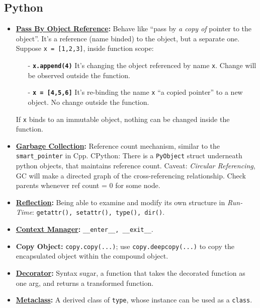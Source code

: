 \documentclass[9pt, landscape]{article}
\begin{document}
\begin{multicols*}{3}
\section{Python}
\begin{itemize}
	\item \textbf{\href{https://www.zhihu.com/question/20591688}{Pass By Object Reference}:} Behave like ``pass by \textit{a copy of} pointer to the object''. It's a reference (name binded) to the object, but a separate one. Suppose \texttt{x = [1,2,3]}, inside function scope:
	\begin{itemize}[leftmargin=10pt,noitemsep,topsep=0pt,partopsep=0pt]
		\item[-] \textbf{\texttt{x.append(4)}} It's changing the object referenced by name \texttt{x}. Change will be observed outside the function.
		\item[-] \textbf{\texttt{x = [4,5,6]}} It's re-binding the name \texttt{x} ``a copied pointer'' to a new object. No change outside the function.
	\end{itemize}
	If \texttt{x} binds to an immutable object, nothing can be changed inside the function.
	\item \textbf{\href{https://www.jianshu.com/p/1e375fb40506}{Garbage Collection}:} Reference count mechanism, similar to the \texttt{smart\_pointer} in Cpp. CPython: There is a \texttt{PyObject} struct underneath python objects, that maintains reference count. Caveat: \textit{Circular Referencing}, GC will make a directed graph of the cross-referencing relationship. Check parents whenever ref count = 0 for some node.
	\item \textbf{\href{https://en.wikibooks.org/wiki/Python_Programming/Reflection}{Reflection}:} Being able to examine and modify its own structure in \textit{Run-Time}: \texttt{getattr(), setattr(), type(), dir()}.
	\item \textbf{\href{https://docs.python.org/3/reference/compound_stmts.html\#the-with-statement}{Context Manager}:} \texttt{\_\_enter\_\_, \_\_exit\_\_}.
	\item \textbf{Copy Object:} \texttt{copy.copy(...)}; use \texttt{copy.deepcopy(...)} to copy the encapsulated object within the compound object.
	\item \textbf{\href{https://www.python.org/dev/peps/pep-0318/}{Decorator}:} Syntax sugar, a function that takes the decorated function as one arg, and returns a transformed function.
	\item \textbf{\href{https://zhuanlan.zhihu.com/p/23887627}{Metaclass}:} A derived class of \texttt{type}, whose instance can be used as a \texttt{class}.
\end{itemize}

\end{multicols*}
\end{document}
